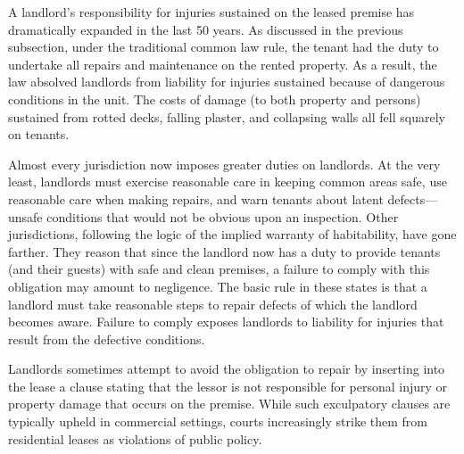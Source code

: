 A landlord's responsibility for injuries sustained on the leased premise has
dramatically expanded in the last 50 years.  As discussed in the previous
subsection, under the traditional common law rule, the tenant had the duty to
undertake all repairs and maintenance on the rented property.  As a result, the
law absolved landlords from liability for injuries sustained because of
dangerous conditions in the unit.  The costs of damage (to both property and
persons) sustained from rotted decks, falling plaster, and collapsing walls all
fell squarely on tenants.

Almost every jurisdiction now imposes greater duties on landlords.  At the very
least, landlords must exercise reasonable care in keeping common areas safe,
use reasonable care when making repairs, and warn tenants about latent
defects---unsafe conditions that would not be obvious upon an inspection. 
Other jurisdictions, following the logic of the implied warranty of
habitability, have gone farther.  They reason that since the landlord now has a
duty to provide tenants (and their guests) with safe and clean premises, a
failure to comply with this obligation may amount to negligence.  The basic
rule in these states is that a landlord must take reasonable steps to repair
defects of which the landlord becomes aware.  Failure to comply exposes
landlords to liability for injuries that result from the defective conditions.

Landlords sometimes attempt to avoid the obligation to repair by inserting into
the lease a clause stating that the lessor is not responsible for personal
injury or property damage that occurs on the premise.  While such exculpatory
clauses are typically upheld in commercial settings, courts increasingly strike
them from residential leases as violations of public policy. 

